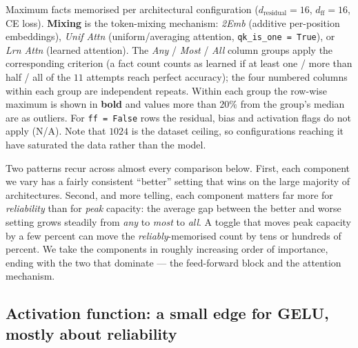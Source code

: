 \documentclass[11pt,a4paper]{article}
\begin{document}
\begin{table}[p]
\footnotesize
\setlength{\tabcolsep}{4.5pt}
\renewcommand{\arraystretch}{0.82}
\setlength{\fboxsep}{1.5pt}  %
\begin{adjustwidth}{-2cm}{-1.2cm}
\centering

\end{adjustwidth}
\caption{Maximum facts memorised per architectural configuration ($d_\text{residual}=16$, $d_\text{ff}=16$, CE loss). \textbf{Mixing} is the token-mixing mechanism: \emph{2Emb} (additive per-position embeddings), \emph{Unif Attn} (uniform/averaging attention, \texttt{qk\_is\_one = True}), or \emph{Lrn Attn} (learned attention). The \emph{Any} / \emph{Most} / \emph{All} column groups apply the corresponding criterion (a fact count counts as learned if at least one / more than half / all of the $11$ attempts reach perfect accuracy); the four numbered columns within each group are independent repeats. Within each group the row-wise maximum is shown in \textbf{bold} and values more than $20\%$ from the group's median are  as outliers. For \texttt{ff = False} rows the residual, bias and activation flags do not apply (N/A). Note that $1024$ is the dataset ceiling, so configurations reaching it have saturated the data rather than the model.}
\label{tab:e5}
\end{table}

Two patterns recur across almost every comparison below. First, each component we vary has a fairly consistent ``better'' setting that wins on the large majority of architectures. Second, and more telling, each component matters far more for \emph{reliability} than for \emph{peak} capacity: the average gap between the better and worse setting grows steadily from \emph{any} to \emph{most} to \emph{all}. A toggle that moves peak capacity by a few percent can move the \emph{reliably}-memorised count by tens or hundreds of percent. We take the components in roughly increasing order of importance, ending with the two that dominate --- the feed-forward block and the attention mechanism.

\subsection{Activation function: a small edge for GELU, mostly about reliability}
\end{document}
